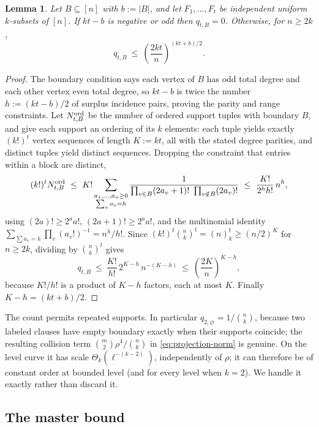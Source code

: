 \documentclass[11pt]{article}
\newtheorem{lemma}[lemma]{Lemma}
\theoremstyle{definition}
\theoremstyle{remark}
\newcommand{\1}{\mathbf 1}
\numberwithin{equation}{section}
\begin{document}
\begin{lemma}\label{lem:boundary-count}
Let $B\subseteq[n]$ with $b:=|B|$, and let $F_1,\ldots,F_t$ be
independent uniform $k$-subsets of $[n]$.  If $kt-b$ is negative or odd
then $q_{t,B}=0$.  Otherwise, for $n\ge2k$,
\begin{equation}\label{eq:boundary-count}
 q_{t,B}\ \le\ \left(\frac{2kt}n\right)^{(kt+b)/2} .
\end{equation}
\end{lemma}
\begin{proof}
The boundary condition says each vertex of $B$ has odd total degree and
each other vertex even total degree, so $kt-b$ is twice the number
$h:=(kt-b)/2$ of surplus incidence pairs, proving the parity and range
constraints.  Let $N^{\rm ord}_{t,B}$ be the number of ordered support
tuples with boundary $B$, and give each support an ordering of its $k$
elements: each tuple yields exactly $(k!)^t$ vertex sequences of length
$K:=kt$, all with the stated degree parities, and distinct tuples yield
distinct sequences.  Dropping the constraint that entries within a block
are distinct,
\[
 (k!)^tN^{\rm ord}_{t,B}
 \ \le\
 K!\sum_{\substack{a_1,\ldots,a_n\ge0\\ \sum_va_v=h}}
 \frac1{\prod_{v\in B}(2a_v+1)!\ \prod_{v\notin B}(2a_v)!}
 \ \le\
 \frac{K!}{2^hh!}\,n^h,
\]
using $(2a)!\ge2^aa!$, $(2a+1)!\ge2^aa!$, and the multinomial identity
$\sum_{\sum a_v=h}\prod_v(a_v!)^{-1}=n^h/h!$.  Since
$(k!)^t\binom nk^t=(n)_k^t\ge(n/2)^K$ for $n\ge2k$, dividing by
$\binom nk^t$ gives
\[
 q_{t,B}\ \le\ \frac{K!}{h!}\,2^{K-h}\,n^{-(K-h)}
 \ \le\ \left(\frac{2K}n\right)^{K-h},
\]
because $K!/h!$ is a product of $K-h$ factors, each at most $K$.
Finally $K-h=(kt+b)/2$.
\end{proof}

The count permits repeated supports.  In particular
$q_{2,\varnothing}=1/\binom nk$, because two labeled clauses have empty
boundary exactly when their supports coincide; the resulting collision
term $\binom m2\rho^4/\binom nk$ in \cref{eq:projection-norm} is genuine.
On the level curve it has scale $\Theta_k(\ell^{-(k-2)})$, independently
of $\rho$; it can therefore be of constant order at bounded level (and
for every level when $k=2$).  We handle it exactly rather than discard it.

\subsection{The master bound}
\end{document}
